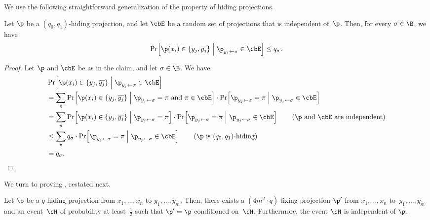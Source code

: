 \documentclass{toc}
\begin{document}
We use the following straightforward generalization of the property
of hiding projections. 
\begin{claim}
\label{claim:generalized-hiding}Let $\p$ be a $(q_{0},q_{1})$-hiding
projection, and let $\cbE$ be a random set of projections that is
independent of~$\p$. Then, for every $\sigma\in\B$, we have
\[
\Pr\!\left[\p(x_{i})\in\left\{ y_{j},\overline{y_{j}}\right\} \;\middle|\;\p_{y_{j}\gets\sigma}\in\cbE\right]\le q_{\sigma}.
\]
\end{claim}
%
\begin{proof}
Let $\p$ and $\cbE$ be as in the claim, and let $\sigma\in\B$.
We have 
\begin{align*}
 & \Pr\!\left[\p(x_{i})\in\left\{ y_{j},\overline{y_{j}}\right\} \;\middle|\;\p_{y_{j}\gets\sigma}\in\cbE\right]\\
 & =\sum_{\pi}\Pr\!\left[\p(x_{i})\in\left\{ y_{j},\overline{y_{j}}\right\} \;\middle|\;\p_{y_{j}\gets\sigma}=\pi\text{~and~}\pi\in\cbE\right]\cdot\Pr\!\left[\p_{y_{j}\gets\sigma}=\pi\;\middle|\;\p_{y_{j}\gets\sigma}\in\cbE\right]\\
 & =\sum_{\pi}\Pr\!\left[\p(x_{i})\in\left\{ y_{j},\overline{y_{j}}\right\} \;\middle|\;\p_{y_{j}\gets\sigma}=\pi\right]\cdot\Pr\!\left[\p_{y_{j}\gets\sigma}=\pi\;\middle|\;\p_{y_{j}\gets\sigma}\in\cbE\right]\tag{\ensuremath{\p} and \ensuremath{\cbE} are independent}\\
 & \le\sum_{\pi}q_{\sigma}\cdot\Pr\!\left[\p_{y_{j}\gets\sigma}=\pi\;\middle|\;\p_{y_{j}\gets\sigma}\in\cbE\right]\tag{\ensuremath{\p} is \ensuremath{(q_{0},q_{1})}-hiding}\\
 & =q_{\sigma}.\qedhere
\end{align*}
\end{proof}

We turn to proving ,
restated next.
\begin{restated}{}
Let $\p$ be a $q$-hiding projection from $x_{1},\ldots,x_{n}$
to $y_{1},\ldots,y_{m}$. Then, there exists a $(4m^{2}\cdot q)$-fixing
projection $\p'$ from $x_{1},\ldots,x_{n}$ to~$y_{1},\ldots,y_{m}$
and an event~$\cH$ of probability at least~$\frac{1}{2}$ such
that $\p'=\p$ conditioned on~$\cH$. Furthermore, the event $\cH$
is independent of $\p$.
\end{restated}
\end{document}
